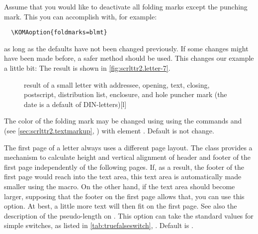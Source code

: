 %
\begin{Example}
  Assume that you would like to deactivate all folding marks except the punching
  mark.  This you can accomplish with, for example:
\begin{lstlisting}
  \KOMAoption{foldmarks=blmt}
\end{lstlisting}
  as long as the defaults have not been changed previously. If some changes
  might have been made before, a safer method should be used. This changes our
  example a little bit:
  The result is shown in \autoref{fig:scrlttr2.letter-7}.
  \begin{figure}
    \setcapindent{0pt}%
    \begin{captionbeside}{%
        result of a small letter with addressee, opening, text, closing,
        postscript, distribution list, enclosure, and hole puncher mark
        (the date is a default of DIN-letters)}[l]
    \end{captionbeside}
    \label{fig:scrlttr2.letter-7}
  \end{figure}
\end{Example}
%
The color of the folding mark may be changed
using using the commands
 and  (see
\autoref{sec:scrlttr2.textmarkup},
) with element
. Default is not change.%
%
%
%

\begin{Declaration}
\end{Declaration}
%
The first page of a letter always uses a different page layout. The
 class provides a mechanism to calculate height and vertical
alignment of header and footer of the first page independently of the
following pages. If, as a result, the footer of the first page would reach
into the text area, this text area is automatically made smaller using the
 macro. On the other hand, if
the text area should become larger, supposing that the footer on the first
page allows that, you can use this option. At best, a little more text will
then fit on the first page. See also the description of the pseudo-length
 on
.  This option can
take the standard values for simple switches, as listed in
\autoref{tab:truefalseswitch}, . Default is
.
%
%

